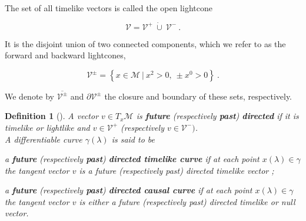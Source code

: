 \documentclass[10pt]{book}
\newcommand{\Mcal}{\mathcal{M}}
\newcommand{\Vcal}{\mathcal{V}}
\theoremstyle{break}
\newtheorem{definition}{Definition}
\begin{document}
The set of all timelike vectors is called the open lightcone 

\begin{equation*}
 \Vcal=\Vcal^{+} \ \dot{\cup} \ \Vcal^{-} \ . 
\end{equation*}

It is the disjoint union of two connected components, which we refer to as the forward and backward lightcones, 

\begin{equation*}
\Vcal^{\pm}=\left\{ x\in\Mcal \ | \ x^{2}>0, \ \pm x^{0}>0 \right\} \ . 
\end{equation*}

We denote by $\overline{\Vcal^{\pm}}$ and $\partial\Vcal^{\pm}$ the closure and boundary of these sets, respectively. \par

\begin{definition}[]
A vector $v \in T_x\Mcal$ is \textbf{future} (respectively \textbf{past}) \textbf{directed} if it is timelike or lightlike and $v \in \Vcal^+$ (respectively $v \in \Vcal^-)$. \\[3pt]
A differentiable curve $\gamma(\lambda)$ is said to be 

\begin{description}
\item a \textbf{future} (respectively \textbf{past}) \textbf{directed timelike curve} if at each point $x(\lambda) \in \gamma$ the tangent vector $v$ is a future (respectively past) directed timelike vector ;
\item a \textbf{future} (respectively \textbf{past}) \textbf{directed causal curve} if at each point $x(\lambda) \in \gamma$ the tangent vector $v$ is either a future (respectively past) directed timelike or null vector. 
\end{description} 

\end{definition}
\end{document}
